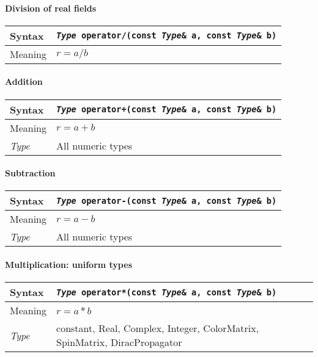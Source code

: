 \documentclass[12pt,letterpaper]{article}
\newcommand{\tConstant}{constant}
\newcommand{\tReal}{Real}
\newcommand{\tComplex}{Complex}
\newcommand{\tInt}{Integer}
\newcommand{\tColorMatrix}{ColorMatrix}
\newcommand{\tDiracPropagator}{DiracPropagator}
\newcommand{\tSpinMatrix}{SpinMatrix}
\newcommand{\allNumericTypes}{All numeric types}
\newcommand{\itt}{\it Type}
\newcommand{\protoBBinaryQual}[1]{{\tt {\it Type} #1(const {\it Type}\& a, const {\it Type}\& b)}}
\begin{document}
\paragraph{Division of real fields}

\begin{flushleft}
  \begin{tabular}{|l|l|}
  \hline
  Syntax      & \protoBBinaryQual{operator/} \\
  \hline
  Meaning     & $r = a/b$ \\
  \hline
  \end{tabular}
\end{flushleft}

\paragraph{Addition}

\begin{flushleft}
  \begin{tabular}{|l|l|}
  \hline
  Syntax      & \protoBBinaryQual{operator+} \\
  \hline
  Meaning     & $r = a + b$ \\
  \hline
  \itt        & \allNumericTypes \\
  \hline
  \end{tabular}
\end{flushleft}

\paragraph{Subtraction}

\begin{flushleft}
  \begin{tabular}{|l|l|}
  \hline
  Syntax      & \protoBBinaryQual{operator-} \\
  \hline
  Meaning     & $r = a - b$ \\
  \hline
  \itt        & \allNumericTypes \\
  \hline
  \end{tabular}
\end{flushleft}

\paragraph{Multiplication: uniform types}

\begin{flushleft}
  \begin{tabular}{|l|l|}
  \hline
  Syntax      & \protoBBinaryQual{operator*} \\
  \hline
  Meaning     & $r = a * b$ \\
  \hline
  \itt        & \tConstant, \tReal, \tComplex, \tInt, \tColorMatrix, \tSpinMatrix, \tDiracPropagator\\
  \hline
  \end{tabular}
\end{flushleft}
\end{document}
